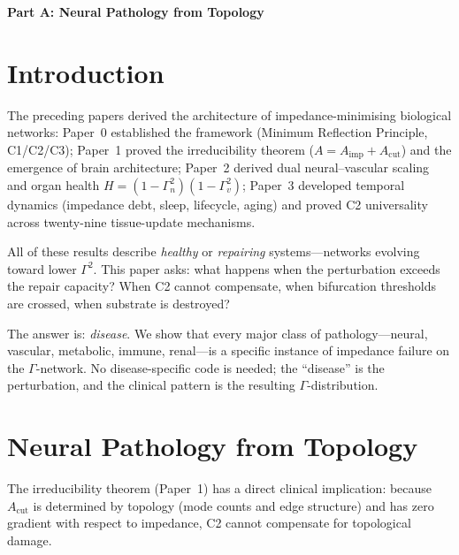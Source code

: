 \documentclass[aps,pre,twocolumn,superscriptaddress,floatfix]{revtex4-2}
\begin{document}
\maketitle


\bigskip\noindent\textbf{\large Part A: Neural Pathology from Topology}
\label{part:A}
\bigskip


\section{Introduction}
\label{sec:intro}

The preceding papers derived the architecture of
impedance-minimising biological networks:
Paper~0 established the framework
(Minimum Reflection Principle, C1/C2/C3);
Paper~1 proved the irreducibility theorem
($A = A_{\text{imp}} + A_{\text{cut}}$) and the
emergence of brain architecture;
Paper~2 derived dual neural--vascular scaling and
organ health $H = (1-\Gamma_n^2)(1-\Gamma_v^2)$;
Paper~3 developed temporal dynamics (impedance debt,
sleep, lifecycle, aging) and proved C2 universality
across twenty-nine tissue-update mechanisms.

All of these results describe \emph{healthy} or
\emph{repairing} systems---networks evolving toward
lower $\Gamma^2$.
This paper asks: what happens when the perturbation
exceeds the repair capacity?
When C2 cannot compensate, when bifurcation thresholds
are crossed, when substrate is destroyed?

The answer is: \emph{disease}.
We show that every major class of pathology---neural,
vascular, metabolic, immune, renal---is a specific
instance of impedance failure on the $\Gamma$-network.
No disease-specific code is needed;
the ``disease'' is the perturbation, and the clinical
pattern is the resulting $\Gamma$-distribution.


\section{Neural Pathology from Topology}
\label{sec:neural-pathology}

The irreducibility theorem (Paper~1) has a direct
clinical implication: because $A_{\text{cut}}$ is
determined by topology (mode counts and edge structure)
and has zero gradient with respect to impedance,
C2 cannot compensate for topological damage.
\end{document}
